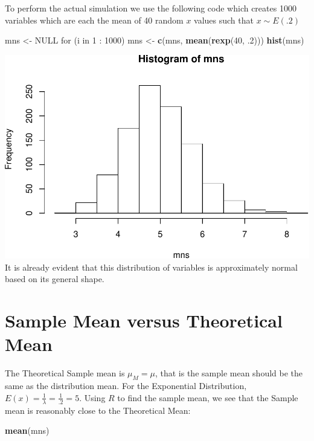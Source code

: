 \documentclass[]{article}
\newenvironment{Shaded}{\begin{snugshade}}{\end{snugshade}}
\newcommand{\KeywordTok}[1]{\textcolor[rgb]{0.13,0.29,0.53}{\textbf{{#1}}}}
\newcommand{\DecValTok}[1]{\textcolor[rgb]{0.00,0.00,0.81}{{#1}}}
\newcommand{\StringTok}[1]{\textcolor[rgb]{0.31,0.60,0.02}{{#1}}}
\newcommand{\OtherTok}[1]{\textcolor[rgb]{0.56,0.35,0.01}{{#1}}}
\newcommand{\NormalTok}[1]{{#1}}
\begin{document}
To perform the actual simulation we use the following code which creates
1000 variables which are each the mean of 40 random \(x\) values such
that \(x \sim E(.2)\)

\begin{Shaded}
\begin{Highlighting}[]
\NormalTok{mns <-}\StringTok{ }\OtherTok{NULL}
\NormalTok{for (i in }\DecValTok{1} \NormalTok{:}\StringTok{ }\DecValTok{1000}\NormalTok{) mns <-}\StringTok{ }\KeywordTok{c}\NormalTok{(mns, }\KeywordTok{mean}\NormalTok{(}\KeywordTok{rexp}\NormalTok{(}\DecValTok{40}\NormalTok{, .}\DecValTok{2}\NormalTok{)))}
\KeywordTok{hist}\NormalTok{(mns)}
\end{Highlighting}
\end{Shaded}

\includegraphics{SI-proj_files/figure-latex/unnamed-chunk-2-1.pdf} It is
already evident that this distribution of variables is approximately
normal based on its general shape.
\section{Sample Mean versus Theoretical Mean} The Theoretical Sample
mean is \(\mu_M = \mu\), that is the sample mean should be the same as
the distribution mean. For the Exponential Distribution,
\(E(x) = \frac{1}{\lambda} = \frac{1}{.2} = 5\). Using \(R\) to find the
sample mean, we see that the Sample mean is reasonably close to the
Theoretical Mean:

\begin{Shaded}
\begin{Highlighting}[]
\KeywordTok{mean}\NormalTok{(mns)}
\end{Highlighting}
\end{Shaded}
\end{document}
